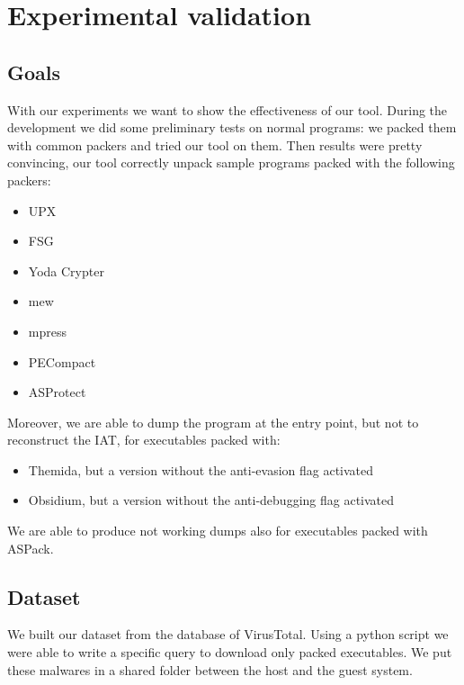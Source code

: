 \chapter{Experimental validation}
\label{chapter5}
\thispagestyle{empty}

\section{Goals}
With our experiments we want to show the effectiveness of our tool. During the development we did some preliminary tests on normal programs: we packed them with common packers and tried our tool on them. Then results were pretty convincing, our tool correctly unpack sample programs packed with the following packers:
\begin{itemize}
\item UPX
\item FSG
\item Yoda Crypter
\item mew
\item mpress
\item PECompact
\item ASProtect
\end{itemize}
Moreover, we are able to dump the program at the entry point, but not to reconstruct the IAT, for executables packed with:
\begin{itemize}
\item Themida, but a version without the anti-evasion flag activated
\item Obsidium, but a version without the anti-debugging flag activated
\end{itemize}
We are able to produce not working dumps also for executables packed with ASPack.

\section{Dataset}
We built our dataset from the database of VirusTotal. Using a python script we were able to write a specific query to download only packed executables. We put these malwares in a shared folder between the host and the guest system.

